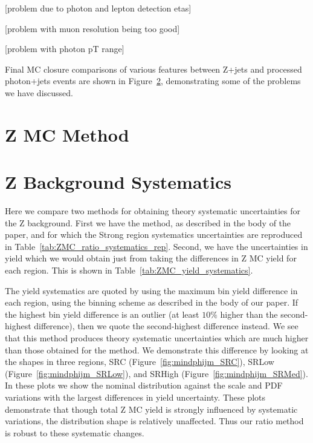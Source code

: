 [problem due to photon and lepton detection etas]

[problem with muon resolution being too good]

[problem with photon pT range]

Final MC closure comparisons of various features between Z+jets and processed photon+jets events are shown in Figure~\ref{}, demonstrating some of the problems we have discussed.

\section{Z MC Method}

\section{Z Background Systematics}

Here we compare two methods for obtaining theory systematic uncertainties for the Z background. First we have the \mindphijm method, as described in the body of the paper, and for which the Strong region systematics uncertainties are reproduced in Table~\ref{tab:ZMC_ratio_systematics_rep}. Second, we have the uncertainties in yield which we would obtain just from taking the differences in Z MC yield for each region. This is shown in Table~\ref{tab:ZMC_yield_systematics}.

The yield systematics are quoted by using the maximum \mll bin yield difference in each region, using the binning scheme as described in the body of our paper. If the highest bin yield difference is an outlier (at least $10\%$ higher than the second-highest difference), then we quote the second-highest difference instead. We see that this method produces theory systematic uncertainties which are much higher than those obtained for the \mindphijm method. We demonstrate this difference by looking at the \mindphijm shapes in three regions, SRC (Figure~\ref{fig:mindphijm_SRC}), SRLow (Figure~\ref{fig:mindphijm_SRLow}), and SRHigh (Figure~\ref{fig:mindphijm_SRMed}). In these plots we show the nominal \mindphijm distribution against the scale and PDF variations with the largest differences in yield uncertainty. These plots demonstrate that though total Z MC yield is strongly influenced by systematic variations, the \mindphijm distribution shape is relatively unaffected. Thus our \mindphijm ratio method is robust to these systematic changes.

